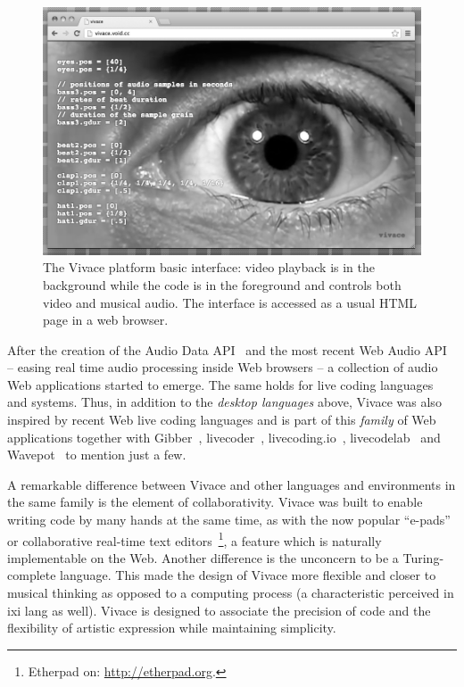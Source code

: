 \documentclass[12pt,times,twocolumn]{article}
\begin{document}
\begin{figure}[htpb]
  \begin{center}
    \includegraphics[scale=.35]{img/fig_vivace_.png}
    \caption{The Vivace platform basic interface: video playback is in the background while the code is in the foreground and controls both video and musical audio. The interface is accessed as a usual HTML page in a web browser.}
    \label{fig:vivace}
  \end{center}
\end{figure}

After the creation of the Audio Data API~\cite{audiodata} and the most
recent Web Audio API~\cite{webaudio} -- easing real time audio
processing inside Web browsers -- a collection of audio Web
applications started to emerge. The same holds for live coding
languages and systems.  Thus, in addition to the \textit{desktop
  languages} above, Vivace was also inspired by recent Web
live coding languages and is part of this \textit{family} of Web
applications together with Gibber~\cite{gibber},
livecoder~\cite{livecoder}, livecoding.io~\cite{livecodingio}, 
livecodelab~\cite{livecodelab} and Wavepot~\cite{wavepot} to mention just a few.

A remarkable difference between Vivace and other languages and
environments in the same family is the element of
collaborativity. Vivace was built to enable writing code by many
hands at the same time, as with the now popular ``e-pads'' or
collaborative real-time text editors~\footnote{Etherpad on:
  \url{http://etherpad.org}.}, a feature which is naturally
implementable on the Web. Another difference is the unconcern to be a
Turing-complete language. This made the design of Vivace more flexible
and closer to musical thinking as opposed to a computing process (a
characteristic perceived in ixi lang as well). Vivace is designed to
associate the precision of code and the flexibility of artistic
expression while maintaining simplicity.
\end{document}
